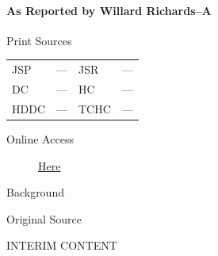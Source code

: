			\paragraph{As Reported by Willard Richards--A}
				\label{EMS-1843-JS-16-JUL-1843-WR-A}
			
				\begin{description}
					\item[Print Sources]
				\end{description}

					\begin{tabular}{p{0.5in}p{1in}p{0.5in}p{1in}}
					JSP	 	& ---		& JSR 		& --- \\
					DC	 	& ---		& HC 		& --- \\
					HDDC 	& ---		& TCHC 		& --- \\
					\end{tabular}
				
				\begin{description}
					\item[Online Access] \href{https://www.josephsmithpapers.org/paper-summary/discourse-16-july-1843-as-reported-by-willard-richards-a/1}{Here}
				\end{description}
				
				\begin{description}
					\item[Background]
				\end{description}
				
				
				\begin{description}
					\item[Original Source]
				\end{description}
				
					INTERIM CONTENT
				
				
